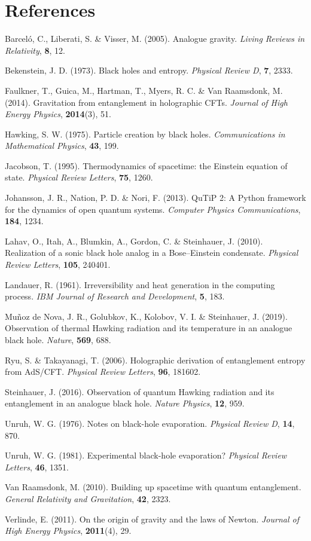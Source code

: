 \documentclass[11pt]{article}
\begin{document}
\section*{References}\label{references}

Barceló, C., Liberati, S. \& Visser, M. (2005). Analogue gravity. \emph{Living Reviews in Relativity}, \textbf{8}, 12.

Bekenstein, J. D. (1973). Black holes and entropy. \emph{Physical Review D}, \textbf{7}, 2333.

Faulkner, T., Guica, M., Hartman, T., Myers, R. C. \& Van Raamsdonk, M. (2014). Gravitation from entanglement in holographic CFTs. \emph{Journal of High Energy Physics}, \textbf{2014}(3), 51.

Hawking, S. W. (1975). Particle creation by black holes. \emph{Communications in Mathematical Physics}, \textbf{43}, 199.

Jacobson, T. (1995). Thermodynamics of spacetime: the Einstein equation of state. \emph{Physical Review Letters}, \textbf{75}, 1260.

Johansson, J. R., Nation, P. D. \& Nori, F. (2013). QuTiP 2: A Python framework for the dynamics of open quantum systems. \emph{Computer Physics Communications}, \textbf{184}, 1234.

Lahav, O., Itah, A., Blumkin, A., Gordon, C. \& Steinhauer, J. (2010). Realization of a sonic black hole analog in a Bose--Einstein condensate. \emph{Physical Review Letters}, \textbf{105}, 240401.

Landauer, R. (1961). Irreversibility and heat generation in the computing process. \emph{IBM Journal of Research and Development}, \textbf{5}, 183.

Muñoz de Nova, J. R., Golubkov, K., Kolobov, V. I. \& Steinhauer, J. (2019). Observation of thermal Hawking radiation and its temperature in an analogue black hole. \emph{Nature}, \textbf{569}, 688.

Ryu, S. \& Takayanagi, T. (2006). Holographic derivation of entanglement entropy from AdS/CFT. \emph{Physical Review Letters}, \textbf{96}, 181602.

Steinhauer, J. (2016). Observation of quantum Hawking radiation and its entanglement in an analogue black hole. \emph{Nature Physics}, \textbf{12}, 959.

Unruh, W. G. (1976). Notes on black-hole evaporation. \emph{Physical Review D}, \textbf{14}, 870.

Unruh, W. G. (1981). Experimental black-hole evaporation? \emph{Physical Review Letters}, \textbf{46}, 1351.

Van Raamsdonk, M. (2010). Building up spacetime with quantum entanglement. \emph{General Relativity and Gravitation}, \textbf{42}, 2323.

Verlinde, E. (2011). On the origin of gravity and the laws of Newton. \emph{Journal of High Energy Physics}, \textbf{2011}(4), 29.
\end{document}
